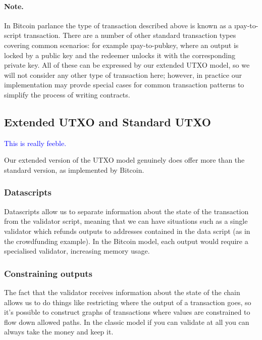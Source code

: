 \documentclass[a4paper]{article}
\newcommand{\blue}[1]{\textcolor{blue}{#1}}
\theoremstyle{definition}  %
\begin{document}
\paragraph{Note.}  In Bitcoin parlance the type of transaction described
above is known as a \i{pay-to-script} transaction.  There are a
number of other standard transaction types covering common
scenarios: for example \i{pay-to-pubkey}, where an output is locked
by a public key and the redeemer unlocks it with the corresponding
private key.  All of these can be expressed by our extended UTXO
model, so we will not consider any other type of transaction here;
however, in practice our implementation may provde special cases for
common transaction patterns to simplify the process of writing
contracts.

\subsection{Extended UTXO and Standard UTXO}

\blue{This is really feeble.}

Our extended version of the UTXO model genuinely does offer more than
the standard version, as implemented by Bitcoin.


\subsubsection{Datascripts}
\label{sec:datascripts}
Datascripts allow us to separate information about the state
of the transaction from the validator script, meaning that we can
have situations such as a single validator which refunds outputs
to addresses contained in the data script (as in the crowdfunding
example).  In the Bitcoin model, each output would require a
specialised validator, increasing memory usage.
    
\subsubsection{Constraining outputs}
\label{sec:constraining-outputs}
The fact that the validator receives information about the
state of the chain allows us to do things like restricting where
the output of a transaction goes, so it's possible to construct
graphs of transactions where values are constrained to flow down
allowed paths. In the classic model if you can validate at all you
can always take the money and keep it.
\end{document}
